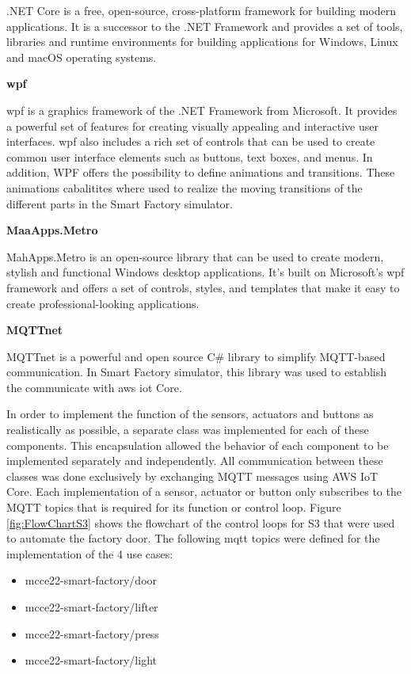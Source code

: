 .NET Core is a free, open-source, cross-platform framework for building modern applications. 
It is a successor to the .NET Framework and provides a set of tools, libraries and runtime environments for building applications for Windows, Linux and macOS operating systems.

\textbf{\ac{wpf}}

\ac{wpf} is a graphics framework of the .NET Framework from Microsoft. 
It provides a powerful set of features for creating visually appealing and interactive user interfaces. \ac{wpf} also includes a rich set of controls that can be used to create common user interface elements such as buttons, text boxes, and menus. 
In addition, WPF offers the possibility to define animations and transitions. 
These animations cabalitites where used to realize the moving transitions of the different parts in the Smart Factory simulator.

\textbf{MaaApps.Metro}

MahApps.Metro is an open-source library that can be used to create modern, stylish and functional Windows desktop applications. 
It's built on Microsoft's \ac{wpf} framework and offers a set of controls, styles, and templates that make it easy to create professional-looking applications.

\textbf{MQTTnet}

MQTTnet is a powerful and open source C\# library to simplify MQTT-based communication. 
In Smart Factory simulator, this library was used to establish the communicate with \ac{aws} \ac{iot} Core.

In order to implement the function of the sensors, actuators and buttons as realistically as possible, a separate class was implemented for each of these components. 
This encapsulation allowed the behavior of each component to be implemented separately and independently. 
All communication between these classes was done exclusively by exchanging MQTT messages using AWS IoT Core. 
Each implementation of a sensor, actuator or button only subscribes to the MQTT topics that is required for its function or control loop. Figure \ref{fig:FlowChartS3} shows the flowchart of the control loops for S3 that were used to automate the factory door. The following \ac{mqtt} topics were defined for the implementation of the 4 use cases:

\begin{itemize}
	\item mcce22-smart-factory/door
	\item mcce22-smart-factory/lifter
	\item mcce22-smart-factory/press
	\item mcce22-smart-factory/light
\end{itemize}

